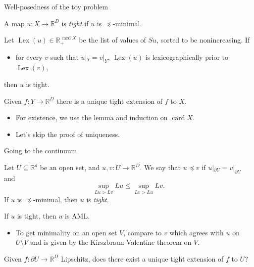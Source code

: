 \documentclass[10pt]{beamer}
\newcommand{\RR}{\mathbb{R}}
\DeclareMathOperator{\card}{card}
\DeclareMathOperator{\Lex}{Lex}
\begin{document}
\begin{frame}{Well-posedness of the toy problem}
\begin{definition}
A map $u: X \to \RR^D$ is \emph{tight} if $u$ is $\preceq$-minimal. \pause
\end{definition}

\begin{lemma}
Let $\Lex(u) \in \RR^{\card X}_+$ be the list of values of $Su$, sorted to be nonincreasing.
If
\begin{itemize}
\item for every $v$ such that $u|_Y = v|_Y$, $\Lex(u)$ is lexicographically prior to $\Lex(v)$,
\end{itemize}
then $u$ is tight. \pause
\end{lemma}

\begin{theorem}
Given $f: Y \to \RR^D$ there is a unique tight extension of $f$ to $X$. \pause
\end{theorem}

\begin{itemize}
    \item For existence, we use the lemma and induction on $\card X$. \pause
    \item Let's skip the proof of uniqueness.
\end{itemize}
\end{frame}

\begin{frame}{Going to the continuum}
\begin{definition}
Let $U \subseteq \RR^d$ be an open set, and $u, v: U \to \RR^D$.
We say that $u \preceq v$ if $u|_{\partial U} = v|_{\partial U}$ and
$$\sup_{Lu > Lv} Lu \leq \sup_{Lv > Lu} Lv.$$
If $u$ is $\preceq$-minimal, then $u$ is \emph{tight}. \pause
\end{definition}

\begin{lemma}
If $u$ is tight, then $u$ is AML. \pause
\end{lemma}

\begin{itemize}
\item To get minimality on an open set $V$, compare to $v$ which agrees with $u$ on $U \setminus V$ and is given by the Kirszbraun-Valentine theorem on $V$. \pause
\end{itemize}

\begin{problem}
Given $f: \partial U \to \RR^D$ Lipschitz, does there exist a unique tight extension of $f$ to $U$?
\end{problem}
\end{frame}
\end{document}
